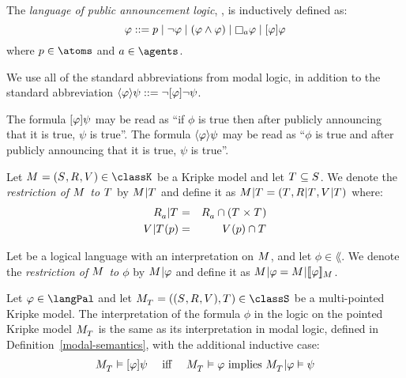 \begin{definition}
The {\em language of public announcement logic}, \langPal{}, is inductively defined as:
$$
\phi ::= 
    \atomP \mid
    \lnot \phi \mid
    (\phi \land \phi) \mid
    \necessary[\agentA] \phi \mid
    \announceA{\phi} \phi
$$
where $\atomP \in \atoms$ and $\agentA \in \agents$.
\end{definition}

We use all of the standard abbreviations from modal logic, in addition to the standard abbreviation $\langle \varphi \rangle \psi ::= \lnot [ \varphi ] \lnot \psi$.

The formula $[ \varphi ] \psi$ may be read as ``if $\phi$ is true then after publicly announcing that it is true, $\psi$ is true''.
The formula $\langle \varphi \rangle \psi$ may be read as ``$\phi$ is true and after publicly announcing that it is true, $\psi$ is true''.

\begin{definition}
Let $\modelAndTuple \in \classK$ be a Kripke model and let $\statesT \subseteq \states$.
We denote the {\em restriction of $\model$ to $\statesT$} by $\restrict{\model}{\statesT}$ and
define it as $\restrict{\model}{\statesT} = (\statesT, \restrict{\accessibilityRel}{\statesT}, \restrict{\valuation}{\statesT})$ where:
\begin{eqnarray*}
    \restrict{\accessibility{\agentA}}{\statesT} &=& \accessibility{\agentA} \cap (\statesT \times \statesT)\\
    \restrict{\valuation}{\statesT}(\atomP) &=& \valuation(\atomP) \cap \statesT
\end{eqnarray*}

Let \lang{} be a logical language with an interpretation on $\model$, and let $\phi \in \lang$.
We denote the {\em restriction of $\model$ to $\phi$} by $\restrict{\model}{\phi}$ and define it as $\restrict{\model}{\phi} = \restrict{\model}{\interpretation[\model]{\phi}}$.
\end{definition}

\begin{definition}
Let $\phi \in \langPal$ and let $\pointedModelAndTuple{\statesT} \in \classS$ be a multi-pointed Kripke model.
The interpretation of the formula $\phi$ in the logic \logicPalS{} on the pointed Kripke model $\pointedModel{\statesT}$ is the same as its interpretation in modal logic, defined in Definition~\ref{modal-semantics}, with the additional inductive case:
$$
\begin{array}{lcl}
\pointedModel{\statesT} \entails \announceA{\phi} \psi & \text{ iff } & \pointedModel{\statesT} \entails \phi \text{ implies } \restrict{\pointedModel{\statesT}}{\phi} \entails \psi
\end{array}
$$
\end{definition}

